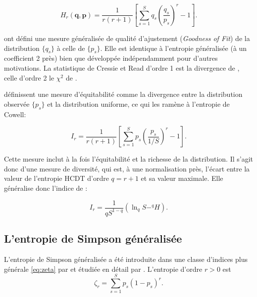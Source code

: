 \documentclass[
  11pt,
  french,
  a4paper,
  extrafontsizes,onecolumn,openright
  ]{memoir}
\begin{document}
\begin{equation}
  \label{eq:Maasoumi1993}
  H_r\left(\mathbf{q},\mathbf{p}\right) = \frac{1}{r\left(r+1\right)}\left[\sum^S_{s=1}{q_s{\left(\frac{q_s}{p_s}\right)}^{r}}-1\right].
\end{equation}

\textcite{Cressie1984} ont défini une mesure généralisée de qualité d'ajustement (\emph{Goodness of Fit}) de la distribution \(\{q_s\}\) à celle de \(\{p_s\}\).
Elle est identique à l'entropie généralisée (à un coefficient 2 près) bien que développée indépendamment pour d'autres motivations.
La statistique de Cressie et Read d'ordre 1 est la divergence de \textcite{Kullback1951}, celle d'ordre 2 le \(\chi^2\) de \textcite{Pearson1900}.

\textcite{Studeny2011} définissent une mesure d'équitabilité comme la divergence entre la distribution observée \(\{p_s\}\) et la distribution uniforme, ce qui les ramène à l'entropie de Cowell:

\begin{equation}
  \label{eq:Studeny2011}
  I_r 
  = \frac{1}{r\left(r+1\right)} \left[\sum^S_{s=1}{p_s \left(\frac{p_s}{1/S} \right)^{r}-1 } \right].
\end{equation}

Cette mesure inclut à la fois l'équitabilité et la richesse de la distribution.
Il s'agit donc d'une mesure de diversité, qui est, à une normalisation près, l'écart entre la valeur de l'entropie HCDT d'ordre \(q=r+1\) et sa valeur maximale.
Elle généralise donc l'indice de \textcite{Theil1967}:

\begin{equation}
  \label{eq:TheilGen}
  I_r = \frac{1}{q S^{1-q}}\left( \ln_q{S} - ^{q}\!H \right).
\end{equation}

\hypertarget{sec:SimpsonG}{%
\subsection{L'entropie de Simpson généralisée}\label{sec:SimpsonG}}

L'entropie de Simpson généralisée a été introduite dans une classe d'indices plus générale \eqref{eq:zeta} par \textcite{Zhang2010} et étudiée en détail par \textcite{Zhang2014}.
L'entropie d'ordre \(r>0\) est
\begin{equation}
  \label{eq:zetar}
  \zeta_r = \sum_{s=1}^S p_s (1-p_s)^r.
\end{equation}
\end{document}
